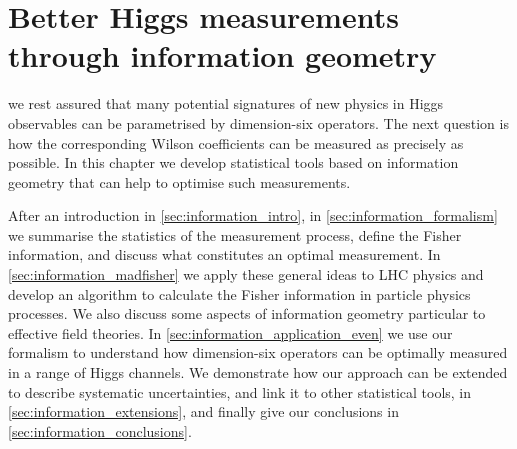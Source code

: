  






\chapter{Better Higgs measurements through information geometry}
\label{chapter:information}

 we rest assured
that many potential signatures of new physics in Higgs observables can
be parametrised by dimension-six operators. The next question is how
the corresponding Wilson coefficients can be measured as precisely as
possible. In this chapter we develop statistical tools based on
information geometry that can help to optimise such measurements.

After an introduction in \autoref{sec:information_intro}, in
\autoref{sec:information_formalism} we summarise the statistics of the
measurement process, define the Fisher information, and discuss what
constitutes an optimal measurement. In
\autoref{sec:information_madfisher} we apply these general ideas to
LHC physics and develop an algorithm to calculate the Fisher
information in particle physics processes. We also discuss some
aspects of information geometry particular to effective field
theories. In \autoref{sec:information_application_even} we use our
formalism to understand how dimension-six operators can be optimally
measured in a range of Higgs channels.
We demonstrate how our approach can be extended to describe systematic
uncertainties, and link it to other statistical tools, in
\autoref{sec:information_extensions}, and finally give our conclusions
in \autoref{sec:information_conclusions}.


